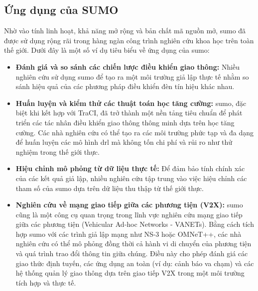 \subsection{Ứng dụng của SUMO}
Nhờ vào tính linh hoạt, khả năng mở rộng và bản chất mã nguồn mở, \ac{sumo} đã được
sử dụng rộng rãi trong hàng ngàn công trình nghiên cứu khoa học trên toàn thế giới.
Dưới đây là một số ví dụ tiêu biểu về ứng dụng của \ac{sumo}:
\begin{itemize}
    \item \textbf{Đánh giá và so sánh các chiến lược điều khiển giao thông:}
        Nhiều nghiên cứu sử dụng \ac{sumo} để tạo ra một môi trường giả lập thực
        tế nhằm so sánh hiệu quả của các phương pháp điều khiển đèn tín hiệu khác
        nhau.

    \item \textbf{Huấn luyện và kiểm thử các thuật toán học tăng cường:} \ac{sumo},
        đặc biệt khi kết hợp với TraCI, đã trở thành một nền tảng tiêu chuẩn để phát
        triển các tác nhân điều khiển giao thông thông minh dựa trên học tăng cường.
        Các nhà nghiên cứu có thể tạo ra các môi trường phức tạp và đa dạng để
        huấn luyện các mô hình \ac{drl} mà không tốn chi phí và rủi ro như thử nghiệm
        trong thế giới thực.

    \item \textbf{Hiệu chỉnh mô phỏng từ dữ liệu thực tế:} Để đảm bảo tính chính
        xác của các kết quả giả lập, nhiều nghiên cứu tập trung vào việc hiệu chỉnh
        các tham số của \ac{sumo} dựa trên dữ liệu thu thập từ thế giới thực.

    \item \textbf{Nghiên cứu về mạng giao tiếp giữa các phương tiện (V2X):} \ac{sumo}
        cũng là một công cụ quan trọng trong lĩnh vực nghiên cứu mạng giao tiếp giữa
        các phương tiện (Vehicular Ad-hoc Networks - VANETs). Bằng cách tích hợp
        \ac{sumo} với các trình giả lập mạng như NS-3 hoặc OMNeT++, các nhà
        nghiên cứu có thể mô phỏng đồng thời cả hành vi di chuyển của phương
        tiện và quá trình trao đổi thông tin giữa chúng. Điều này cho phép đánh giá
        các giao thức định tuyến, các ứng dụng an toàn (ví dụ: cảnh báo va chạm)
        và các hệ thống quản lý giao thông dựa trên giao tiếp V2X trong một môi trường
        tích hợp và thực tế.
\end{itemize}
